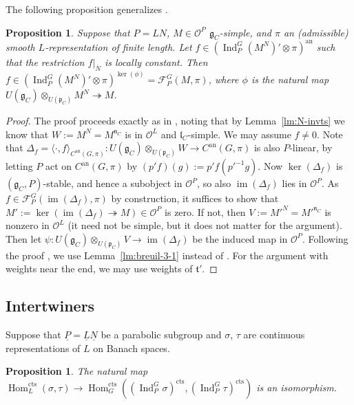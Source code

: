 \documentclass[a4paper]{amsart}
\numberwithin{equation}{section}
\newtheorem{prop}[thm]{Proposition}
\theoremstyle{remark}
\theoremstyle{definition}
\DeclareMathOperator{\Ind}{Ind}
\DeclareMathOperator{\Hom}{Hom}
\DeclareMathOperator{\im}{im}
\newcommand{\alggrp}[1]{\underline{#1}}
\newcommand{\an}{\mathrm{an}}
\newcommand{\cts}{\mathrm{cts}}
\newcommand{\onto}{\twoheadrightarrow}
\begin{document}
The following proposition generalizes \cite[Proposition 3.2]{socle1}. 

\begin{prop}\label{prop:loc-const-fns}
  Suppose that $P = LN$, $M \in \mathcal{O}^{P}$ $\mathfrak{g}_{C}$-simple, and $\pi$ an (admissible) smooth $L$-representation of finite length.
  Let $f \in (\Ind_P^G (M^N)' \otimes \pi)^{\an}$ such that the restriction $f|_{\overline{N}}$ is locally constant.
  Then $f \in (\Ind_P^G (M^N)' \otimes \pi)^{\ker(\phi)} = \mathcal{F}_P^G(M,\pi)$, where $\phi$ is the natural map $U(\mathfrak{g}_{C}) \otimes_{U(\mathfrak{p}_{C})} M^N \onto M$.
\end{prop}

\begin{proof}
  The proof proceeds exactly as in \cite{socle1}, noting that by Lemma~\ref{lm:N-invts} we know that $W := M^N = M^{\mathfrak{n}_C}$ is in $\mathcal{O}^{L}$ and $\mathfrak{l}_{C}$-simple.
  We may assume $f\ne 0$.
  Note that $\Delta_{f} = \langle\cdot,f\rangle_{C^{\an}(G,\pi)} \colon U(\mathfrak{g}_{C}) \otimes_{U(\mathfrak{p}_{C})} W \to C^{\an}(G,\pi)$ is also $P$-linear, by letting $P$ act on $C^{\an}(G,\pi)$ by $(p'f)(g) := p'f(p'^{-1}g)$.
  Now $\ker(\Delta_f)$ is $(\mathfrak{g}_C,P)$-stable, and hence a subobject in $\mathcal{O}^{P}$, so also $\im(\Delta_f)$ lies in $\mathcal{O}^{P}$.
  As $f \in \mathcal{F}_P^G(\im(\Delta_f),\pi)$ by construction, it suffices to show that $M' := \ker(\im(\Delta_f) \onto M) \in \mathcal{O}^{P}$ is zero.
  If not, then $V := M'^N = M'^{\mathfrak{n}_C}$ is nonzero in $\mathcal{O}^{L}$ (it need not be simple, but it does not matter for the argument).
  Then let $\psi \colon U(\mathfrak{g}_{C}) \otimes_{U(\mathfrak{p}_{C})} V \to \im(\Delta_f)$ be the induced map in $\mathcal{O}^{P}$.
  Following the proof \cite[Proposition 3.2]{socle1}, we use Lemma~\ref{lm:breuil-3-1} instead of \cite[Lemma 3.1]{socle1}.
  For the argument with weights near the end, we may use weights of $\mathfrak{t}'$.
\end{proof}


\subsection{Intertwiners}
\label{sec:intertwiners}

Suppose that $\alggrp{P} = \alggrp{L}\alggrp{N}$ be a parabolic subgroup and $\sigma$, $\tau$ are continuous representations of $L$ on Banach spaces.

\begin{prop}\label{prop:intertwiners}
  The natural map $\Hom_{L}^\cts(\sigma,\tau) \to \Hom_G^\cts((\Ind_{P}^G\sigma)^{\cts},(\Ind_{P}^G\tau)^{\cts})$ is an isomorphism.
\end{prop}
\end{document}
